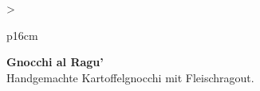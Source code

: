 \documentclass[
  beamerpaper,
  DIV=11,
  numbers=noendperiod,
  aspectratio=54]{scrreprt}
\begin{document}
\begin{table}

\caption{\label{tbl-panel-gnocchi}Gnocchi}\begin{minipage}[t]{\linewidth}

\tabularnewline

\fontsize{16}{18}\selectfont
\begin{tabular}{>{\raggedright\arraybackslash}p{16cm}}
\toprule
\begingroup\fontsize{18}{20}\selectfont \textbf{Gnocchi al Ragu'}\endgroup\\
\midrule
Handgemachte Kartoffelgnocchi mit Fleischragout.\\
\bottomrule
\end{tabular}

\end{minipage}%
\newline
\begin{minipage}[t]{\linewidth}


\end{minipage}%

\end{table}

\break
\end{document}
